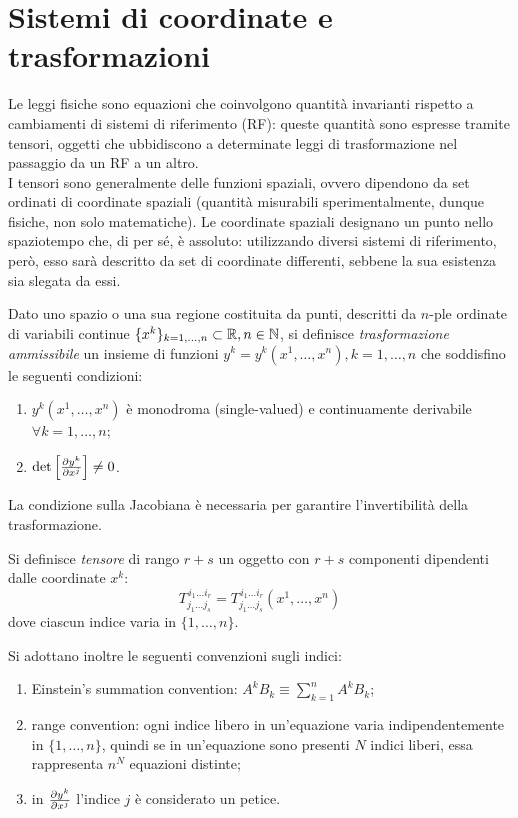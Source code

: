 
\section{Sistemi di coordinate e trasformazioni}


Le leggi fisiche sono equazioni che coinvolgono quantità invarianti rispetto a cambiamenti di sistemi di riferimento (RF): queste quantità sono espresse tramite tensori, oggetti che ubbidiscono a determinate leggi di trasformazione nel passaggio da un RF a un altro. \\ 
I tensori sono generalmente delle funzioni spaziali, ovvero dipendono da set ordinati di coordinate spaziali (quantità misurabili sperimentalmente, dunque fisiche, non solo matematiche). Le coordinate spaziali designano un punto nello spaziotempo che, di per sé, è assoluto: utilizzando diversi sistemi di riferimento, però, esso sarà descritto da set di coordinate differenti, sebbene la sua esistenza sia slegata da essi.

\begin{definition}
	Dato uno spazio o una sua regione costituita da punti, descritti da $ n $-ple ordinate di variabili continue $ \{x^k\}_{k=1,\dots,n}\subset\mathbb{R}, n \in \mathbb{N} $, si definisce \textit{trasformazione ammissibile} un insieme di funzioni $ y^k = y^k (x^1, \dots, x^n), k = 1, \dots, n $ che soddisfino le seguenti condizioni:
	\begin{enumerate}
		\item $ y^k (x^1, \dots, x^n) $ è monodroma (single-valued) e continuamente derivabile $ \forall k = 1, \dots, n $;
		\item $ \det \left[ \frac{\partial y^k}{\partial x^j} \right] \neq 0 $.
	\end{enumerate}
\end{definition}

La condizione sulla Jacobiana è necessaria per garantire l'invertibilità della trasformazione. 

\begin{definition}
	Si definisce \textit{tensore} di rango $ r+s $ un oggetto con $ r+s $ componenti dipendenti dalle coordinate $ x^k $:
	\begin{equation}
		T^{\,i_1 \dots i_r}_{j_1 \dots j_s} = T^{\,i_1 \dots i_r}_{j_1 \dots j_s} (x^1, \dots, x^n)
		\label{eq:1}
	\end{equation}
	dove ciascun indice varia in $ \{1, \dots, n\} $.
\end{definition}
Si adottano inoltre le seguenti convenzioni sugli indici:
\begin{enumerate}
	\item Einstein's summation convention: $ A^k B_k \equiv \sum_{k = 1}^{n} A^k B_k $;
	\item range convention: ogni indice libero in un'equazione varia indipendentemente in $ \{1, \dots, n\} $, quindi se in un'equazione sono presenti $ N $ indici liberi, essa rappresenta $ n^N $ equazioni distinte;
	\item in $ \frac{\partial y^k}{\partial x^j} $ l'indice $ j $ è considerato un petice.
\end{enumerate}

